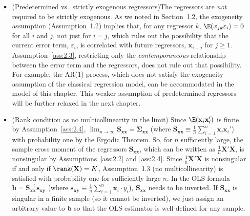 \begin{itemize}
\item (Predetermined vs.\ strictly exogenous regressors)\quad The regressors are
  \emph{not} required to be strictly exogenous.  As we noted in Section~1.2, the
  exogeneity assumption (Assumption~1.2) implies that, for any regressor $k$,
  $\E(x_{jk}\varepsilon_i) = 0$ for all $i$ and $j$, not just for $i = j$, which
  rules out the possibility that the current error term, $\varepsilon_i$, is
  correlated with future regressors, $\mathbf{x}_{i+j}$ for $j \geq 1$.
  Assumption~\ref{ass:2.3}, restricting only the \emph{contemporaneous} relationship
  between the error term and the regressors, does not rule out that possibility.
  For example, the AR(1) process, which does not satisfy the exogeneity assumption of
  the classical regression model, can be accommodated in the model of this chapter.
  This weaker assumption of predetermined regressors will be further relaxed in the
  next chapter.

\item (Rank condition as no multicollinearity in the limit)\quad
  Since $\E(\mathbf{x}_i\mathbf{x}_i')$ is finite by Assumption~\ref{ass:2.4},
  $\lim_{n \to \infty} \mathbf{S}_{\mathbf{xx}} = \bm{\Sigma}_{\mathbf{xx}}$
  (where $\mathbf{S}_{\mathbf{xx}} \equiv \frac{1}{n}\sum_{i=1}^{n}
  \mathbf{x}_i\mathbf{x}_i'$) with probability one by the Ergodic Theorem.  So, for
  $n$ sufficiently large, the sample cross moment of the regressors
  $\mathbf{S}_{\mathbf{xx}}$, which can be written as
  $\frac{1}{n}\mathbf{X}'\mathbf{X}$, is nonsingular by Assumptions~\ref{ass:2.2} and
  \ref{ass:2.4}.  Since $\frac{1}{n}\mathbf{X}'\mathbf{X}$ is nonsingular if and only
  if $\rank(\mathbf{X}) = K$, Assumption~1.3 (no multicollinearity) is satisfied with
  probability one for sufficiently large $n$.  In the OLS formula
  $\mathbf{b} = \mathbf{S}_{\mathbf{xx}}^{-1}\mathbf{s}_{\mathbf{xy}}$
  (where $\mathbf{s}_{\mathbf{xy}} \equiv \frac{1}{n}\sum_{i=1}^{n}
  \mathbf{x}_i \cdot y_i$), $\mathbf{S}_{\mathbf{xx}}$ needs to be inverted.  If
  $\mathbf{S}_{\mathbf{xx}}$ is singular in a finite sample (so it cannot be
  inverted), we just assign an arbitrary value to $\mathbf{b}$ so that the OLS
  estimator is well-defined for any sample.


\end{itemize}
